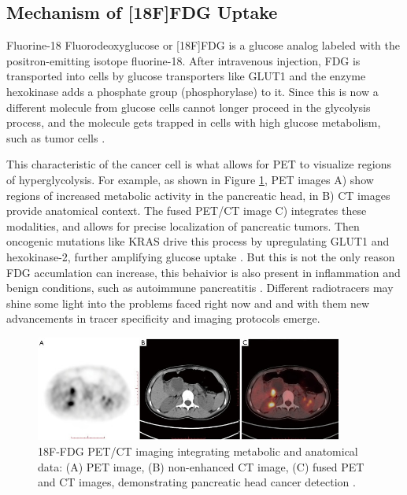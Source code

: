 \subsection{Mechanism of [18F]FDG Uptake}


Fluorine-18 Fluorodeoxyglucose or [18F]FDG is a glucose analog labeled with the positron-emitting isotope fluorine-18. After intravenous injection, FDG is transported into cells by glucose transporters like GLUT1 and  the enzyme hexokinase adds a phosphate group (phosphorylase) to it. Since this is now a different molecule from glucose cells cannot longer proceed in the glycolysis process, and the molecule gets trapped in cells with high glucose metabolism, such as tumor cells \cite{TG174, Zheng2018}.

This characteristic of the cancer cell is what allows for PET to visualize regions of hyperglycolysis. For example, as shown in Figure \ref{fig:PuFig1}, PET images A) show regions of increased metabolic activity in the pancreatic head, in B) CT images provide anatomical context. The fused PET/CT image C) integrates these modalities, and allows for precise localization of pancreatic tumors.
Then oncogenic mutations like KRAS drive this process by upregulating GLUT1 and hexokinase-2, further amplifying glucose uptake \cite{Deng2021}. But this is not the only reason FDG accumlation can increase, this behaivior is also present in inflammation and benign conditions, such as autoimmune pancreatitis \cite{Zheng2018}. Different radiotracers may shine some light into the problems faced right now and and with them new advancements in tracer specificity and imaging protocols emerge.

\begin{figure}[H]
	\centering
	\includegraphics[width=0.9\textwidth]{assets/tcr-10-07-3560-f1.jpg}
	\caption{18F-FDG PET/CT imaging integrating metabolic and anatomical data: (A) PET image, (B) non-enhanced CT image, (C) fused PET and CT images, demonstrating pancreatic head cancer detection \cite{Pu2021}.}
	\label{fig:PuFig1}
\end{figure}
